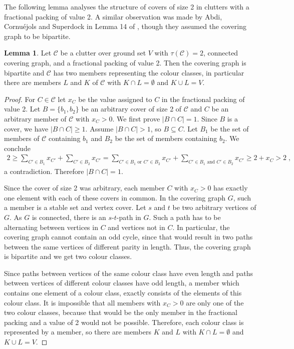 \documentclass[a4paper, 12pt]{scrbook}
\theoremstyle{definition}
\newtheorem{lemma}[theorem]{Lemma}
\begin{document}
    The following lemma analyses the structure of covers of size 2 in clutters with a fractional packing of value 2. A similar observation was made by Abdi, Cornuéjols and Superdock in Lemma 14 of \cite{lemma}, though they assumed the covering graph to be bipartite.

   \begin{lemma}\label{bipartite}
       Let $\mathcal{C}$ be a clutter over ground set $V$ with $\tau(\mathcal{C})=2$, connected covering graph, and a fractional packing of value 2.
       Then the covering graph is bipartite and $\mathcal{C}$ has two members representing the colour classes, in particular there are members $L$ and $K$ of $\mathcal{C}$ with $K \cap L = \emptyset$ and $K \cup L = V$.
   \end{lemma}

   \begin{proof}
       For $C \in \mathcal{C}$ let $x_C$ be the value assigned to $C$ in the fractional packing of value 2.
       Let $B=\{b_1,b_2\}$ be an arbitrary cover of size 2 of $\mathcal{C}$ and $C$ be an arbitrary member of $\mathcal{C}$ with $x_{C} > 0$.
       We first prove $|B\cap C| = 1$.
       Since $B$ is a cover, we have $|B\cap C| \geq 1$.
       Assume $|B \cap C| > 1$, so $B \subseteq C$.
       Let $B_1$ be the set of members of $\mathcal{C}$ containing $b_1$ and $B_2$ be the set of members containing $b_2$.
       We conclude
       \begin{align*}
           2 \geq \sum_{C'\in B_1} x_{C'} + \sum_{C' \in B_2} x_{C'} = \sum_{C' \in B_1 \text{ or } C' \in B_2} x_{C'} + \sum_{C' \in B_1 \text{ and } C' \in B_2} x_{C'} \geq 2 + x_C > 2 \;,
       \end{align*}
       a contradiction. Therefore $|B\cap C| = 1$.

       Since the cover of size 2 was arbitrary, each member $C$ with $x_C>0$ has exactly one element with each of these covers in common.
       In the covering graph $G$, such a member is a stable set and vertex cover.
       Let $s$ and $t$ be two arbitrary vertices of $G$.
       As $G$ is connected, there is an $s$-$t$-path in $G$.
       Such a path has to be alternating between vertices in $C$ and vertices not in $C$.
       In particular, the covering graph cannot contain an odd cycle, since that would result in two paths between the same vertices of different parity in length. Thus, the covering graph is bipartite and we get two colour classes.

       Since paths between vertices of the same colour class have even length and paths between vertices of different colour classes have odd length, a member which contains one element of a colour class, exactly consists of the elements of this colour class.
       It is impossible that all members with $x_C > 0$ are only one of the two colour classes, because that would be the only member in the fractional packing and a value of 2 would not be possible.
       Therefore, each colour class is represented by a member, so there are members $K$ and $L$ with $K \cap L = \emptyset$ and $K \cup L = V$.
   \end{proof}
\end{document}
